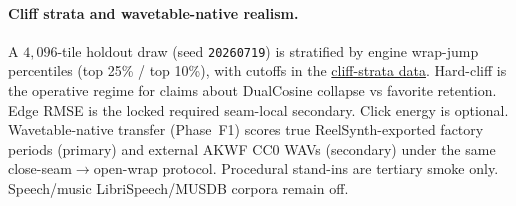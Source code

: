 \paragraph{Cliff strata and wavetable-native realism.}
A $4{,}096$-tile holdout draw (seed \texttt{20260719}) is stratified by engine wrap-jump percentiles (top 25\% / top 10\%), with cutoffs in the \href{https://github.com/reeldemo/denoise-opt-meta/blob/master/paper/Unsupervised_Wrap-Discontinuity_Repair_in_Wavetable_Synthesis_via_Hybrid_GA-PPO_Meta-Search_v12/figures/cliff_strata.json}{cliff-strata data}.
Hard-cliff is the operative regime for claims about DualCosine collapse vs favorite retention.
Edge RMSE is the locked required seam-local secondary. Click energy is optional.
Wavetable-native transfer (Phase~F1) scores true ReelSynth-exported factory periods (primary) and external AKWF CC0 WAVs (secondary) under the same close-seam$\to$open-wrap protocol.
Procedural stand-ins are tertiary smoke only.
Speech/music LibriSpeech/MUSDB corpora remain off.


